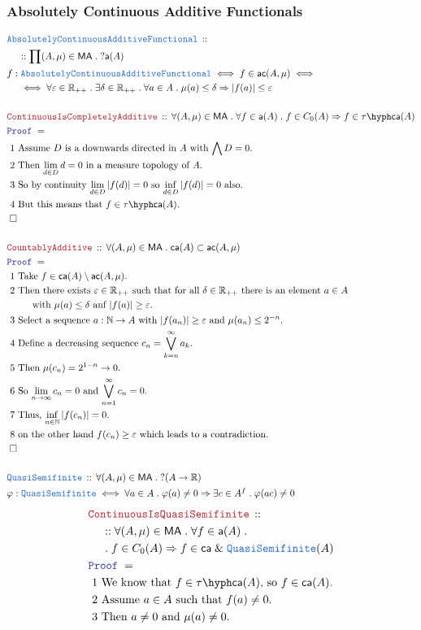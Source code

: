 \documentclass[12pt]{scrartcl}
\newcommand{\TYPE}[1]{\textcolor{NavyBlue}{\mathtt{#1}}}
\newcommand{\LOGIC}[1]{\textcolor{Blue}{\mathtt{#1}}}
\newcommand{\THM}[1]{\textcolor{Maroon}{\mathtt{#1}}}
\renewcommand{\.}{\; . \;}
\newcommand{\Theorem}[2]{& \THM{#1} \, :: \, #2 \\ & \Proof = \\ }
\newcommand{\DeclareType}[2]{& \TYPE{#1} \, :: \, #2 \\}
\newcommand{\DefineType}[3]{& #1 : \TYPE{#2} \iff #3 \\}
\newcommand{\DefineNamedType}[4]{& #1 : \TYPE{#2} \iff #3 \iff #4 \\}
\newcommand{\NewLine}{\\ & \kern 1pc}
\newcommand{\Page}[1]{ \begin{align*} #1 \end{align*}   }
\renewcommand{\And}{\; \& \;}
\newcommand{\Imply}{\Rightarrow}
\newcommand{\Reals}{\mathbb{R} }
\newcommand{\Nat}{\mathbb{N} }
\newcommand{\QED}{\; \square}
\newcommand{\EndProof}{& \QED \\}
\newcommand{\Proof}{\LOGIC{Proof} \; }
\newcommand{\Explain}[1]{& \text{#1.} \\}
\newcommand{\ExplainFurther}[1]{& \text{#1} \\}
\newcommand{\caf}{\mathsf{ca}}
\newcommand{\af}{\mathsf{a}}
\newcommand{\ac}{\mathsf{ac}}
\newcommand{\ma}{\mathsf{MA}}
\newcommand{\Caf}{\tau\hyph\mathsf{ca}}
\begin{document}
\subsubsection{Absolutely Continuous Additive Functionals}
\Page{
	\DeclareType{AbsolutelyContinuousAdditiveFunctional}
	{
		\NewLine ::		
		\prod (A,\mu) \in \ma \.  ?\af(A) 
	}
	\DefineNamedType{f}{AbsolutelyContinuousAdditiveFunctional}{f \in \ac(A,\mu)}
	{
		\NewLine \iff		
		\forall \varepsilon \in \Reals_{++} \.
		\exists \delta \in \Reals_{++} \.
		\forall a \in A \. \mu(a) \le \delta \Imply |f(a)| \le \varepsilon 
	}
	\\
	\Theorem{ContinuousIsCompletelyAdditive}
	{
		\forall (A,\mu) \in \ma \.
		\forall f \in \af(A) \.
		f \in C_0(A) \Imply f \in \Caf(A)
	}
	\Explain{ 1 Assume $D$ is a downwards directed in $A$ with $\bigwedge D = 0$}
	\Explain{ 2 Then $\lim_{d \in D} d = 0$ in a measure topology of $A$}
	\Explain{ 3 So by continuity $\lim_{d \in D} |f(d)| = 0$ so $\inf_{d \in D} |f(d)| = 0$ also}
	\Explain{ 4 But this means that $f \in \Caf(A)$}
	\EndProof
	\\
	\Theorem{CountablyAdditive}
	{
		\forall (A,\mu) \in \ma \.
		\caf(A) \subset \ac(A,\mu) 
	}
	\Explain{ 1 Take $f \in \caf(A) \setminus \ac(A,\mu)$}
	\ExplainFurther{ 2 Then there exists $\varepsilon \in \Reals_{++}$
		such that for all $\delta \in \Reals_{++}$ there is an 
		element $a \in A$} 
	\Explain{ $\quad\quad$ with $\mu(a) \le \delta$ anf $|f(a)| \ge \varepsilon$}
	\Explain{ 3 Select a sequence $a : \Nat \to A$ 
		with $|f(a_n)| \ge \varepsilon$ and $\mu(a_n) \le 2^{-n}$}
	\Explain{ 4  Define a decreasing sequence $c_n = \bigvee_{k=n}^\infty a_k$}
	\Explain{ 5  Then $\mu(c_n) = 2^{1-n} \to 0$}
	\Explain{ 6  So $\lim_{n \to \infty} c_n = 0$ and $\bigvee^\infty_{n=1} c_n = 0$}
	\Explain{ 7  Thus, $\inf_{n \in \Nat} |f(c_n)| = 0$}
	\Explain{ 8 on the other hand $f(c_n) \ge \varepsilon$ which leads to a contradiction}
	\EndProof
	\\
	\DeclareType{QuasiSemifinite}{ 
		\forall (A,\mu) \in \ma \.  ?(A \to \Reals)	
	}
	\DefineType{\varphi}{QuasiSemifinite}
	{
		\forall a  \in A \. \varphi(a) \neq 0 \Imply
		\exists c \in A^f \. \varphi(ac) \neq 0
	}
}\Page{
	\Theorem{ContinuousIsQuasiSemifinite}
	{
		\NewLine :: 		
		\forall (A,\mu) \in \ma \.
		\forall f \in \af(A) \. \NewLine \.
		f \in C_0(A) \Imply  f \in \caf \And \TYPE{QuasiSemifinite}(A) 
	}
	\Explain{ 1 We know that $f \in \Caf(A)$, so $f \in \caf(A)$}
	\Explain{ 2 Assume $a \in A$ such that $f(a) \neq 0$}
	\Explain{ 3 Then $a \neq 0$ and $\mu(a) \neq 0$}
}
\end{document}
